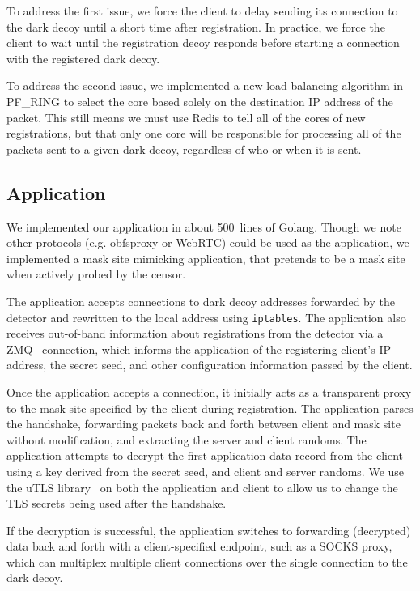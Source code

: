 \documentclass[letterpaper,twocolumn,10pt]{article}
\begin{document}
To address the first issue, we force the client to delay sending its connection
to the dark decoy until a short time after registration. In practice, we force
the client to wait until the registration decoy responds before starting a
connection with the registered dark decoy.

To address the second issue, we implemented a new load-balancing algorithm in
PF\_RING to select the core based solely on the destination IP address of the
packet. This still means we must use Redis to tell all of the cores of new
registrations, but that only one core will be responsible for processing all of
the packets sent to a given dark decoy, regardless of who or when it is sent.


\subsection{Application}

We implemented our application in about 500~lines of Golang. Though we note
other protocols (e.g. obfsproxy or WebRTC) could be used as the application, we
implemented a mask site mimicking application, that pretends to be a mask site
when actively probed by the censor.

The application accepts connections to dark decoy addresses forwarded by the
detector and rewritten to the local address using \texttt{iptables}.
The application also receives out-of-band information about registrations from the
detector via a ZMQ~\cite{zmq} connection, which informs the application of the
registering client's IP address, the secret seed, and other configuration
information passed by the client.

Once the application accepts a connection, it initially acts as a transparent
proxy to the mask site specified by the client during registration. The
application parses the handshake, forwarding packets back and forth between
client and mask site without modification, and extracting the server and client
randoms. The application attempts to decrypt the first application data record
from the client using a key derived from the secret seed, and client and server
randoms. We use the uTLS library~\cite{utls} on both the application and client
to allow us to change the TLS secrets being used after the handshake.

If the decryption is successful, the application switches to forwarding
(decrypted) data back and forth with a client-specified endpoint, such as a
SOCKS proxy, which can multiplex multiple client connections over the single
connection to the dark decoy.
\end{document}
